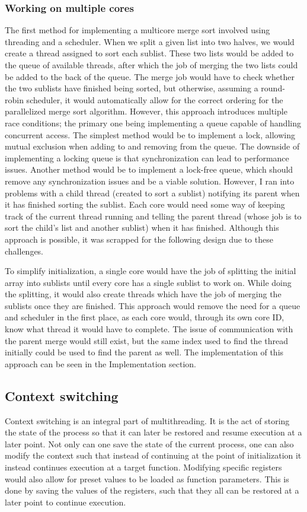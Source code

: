 \subsubsection*{Working on multiple cores}
The first method for implementing a multicore merge sort involved using
threading and a scheduler. When we split a given list into two halves, we would
create a thread assigned to sort each sublist. These two lists would be added to
the queue of available threads, after which the job of merging the two lists
could be added to the back of the queue. The merge job would have to check
whether the two sublists have finished being sorted, but otherwise, assuming a
round-robin scheduler, it would automatically allow for the correct ordering for
the parallelized merge sort algorithm. However, this approach introduces
multiple race conditions; the primary one being implementing a queue capable of
handling concurrent access. The simplest method would be to implement a lock,
allowing mutual exclusion when adding to and removing from the queue. The
downside of implementing a locking queue is that synchronization can lead to
performance issues. Another method would be to implement a lock-free queue,
which should remove any synchronization issues and be a viable solution.
However, I ran into problems with a child thread (created to sort a sublist)
notifying its parent when it has finished sorting the sublist. Each core would
need some way of keeping track of the current thread running and telling the
parent thread (whose job is to sort the child's list and another sublist) when
it has finished. Although this approach is possible, it was scrapped for the
following design due to these challenges.

To simplify initialization, a single core would have the job of splitting the
initial array into sublists until every core has a single sublist to work on.
While doing the splitting, it would also create threads which have the job of
merging the sublists once they are finished. This approach would remove the need
for a queue and scheduler in the first place, as each core would, through its
own core ID, know what thread it would have to complete. The issue of
communication with the parent merge would still exist, but the same index used
to find the thread initially could be used to find the parent as well. The
implementation of this approach can be seen in the Implementation section.


\subsection{Context switching}
Context switching is an integral part of multithreading. It is the act of
storing the state of the process so that it can later be restored and resume
execution at a later point. Not only can one save the state of the current
process, one can also modify the context such that instead of continuing at the
point of initialization it instead continues execution at a target function.
Modifying specific registers would also allow for preset values to be loaded as
function parameters. This is done by saving the values of the registers, such
that they all can be restored at a later point to continue execution.


